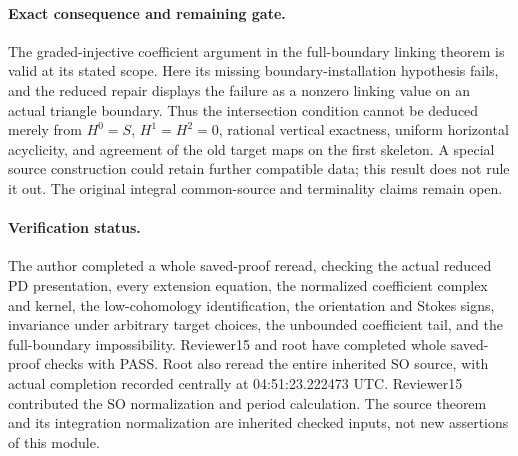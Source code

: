 \paragraph{Exact consequence and remaining gate.}
The graded-injective coefficient argument in the full-boundary
linking theorem is valid at its stated scope.  Here its missing
boundary-installation hypothesis fails, and the reduced repair
displays the failure as a nonzero linking value on an actual
triangle boundary.  Thus the intersection condition cannot be
deduced merely from \(H^0=S\), \(H^1=H^2=0\), rational
vertical exactness, uniform horizontal acyclicity, and agreement
of the old target maps on the first skeleton.  A special source
construction could retain further compatible data; this result
does not rule it out.  The original integral common-source
and terminality claims remain open.

\paragraph{Verification status.}
The author completed a whole saved-proof reread, checking the
actual reduced PD presentation, every extension equation, the
normalized coefficient complex and kernel, the low-cohomology
identification, the orientation and Stokes signs, invariance
under arbitrary target choices, the unbounded coefficient tail,
and the full-boundary impossibility.  Reviewer15 and root have completed whole saved-proof checks
with PASS.  Root also reread the entire inherited SO source,
with actual completion recorded centrally at 04:51:23.222473 UTC.
Reviewer15 contributed the SO normalization and period calculation.  The source theorem and its integration
normalization are inherited checked inputs, not new assertions
of this module.
